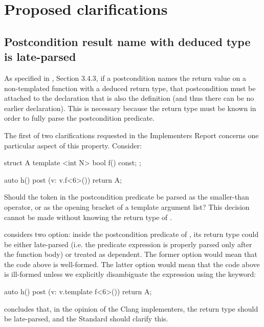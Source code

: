 
\tableofcontents*
\pagebreak





\section{Proposed clarifications}

\subsection{Postcondition result name with deduced type is late-parsed}

As specified in \cite{P2900R10}, Section 3.4.3, if a postcondition names the return value on a non-templated function with a deduced return type, that postcondition must be attached to the declaration that is also the definition (and thus there
can be no earlier declaration). This is necessary because the return type must be known in order to fully parse the postcondition predicate.

The first of two clarifications requested in the Implementers Report \cite{P3460R0} concerns one particular aspect of this property. Consider:
\begin{codeblock}
struct A {
  template <int N> bool f() const;
};

auto h()
post (v: v.f<6>()) {
  return A{};
}
\end{codeblock}
Should the token \tcode{<} in the postcondition predicate be parsed as the smaller-than operator, or as the opening bracket of a template argument list? This decision cannot be made without knowing the return type of .

\cite{P3460R0} considers two option: inside the postcondition predicate of , its return type could be either late-parsed (i.e. the predicate expression is properly parsed only after the function body) or treated as dependent. The former option would mean that the code above is well-formed. The latter option would mean that the code above is ill-formed unless we explicitly disambiguate the expression using the  keyword:
\begin{codeblock}
auto h()
post (v: v.template f<6>()) {
  return A{};
}
\end{codeblock}
\cite{P3460R0} concludes that, in the opinion of the Clang implementers, the return type should be late-parsed, and the Standard should clarify this.

